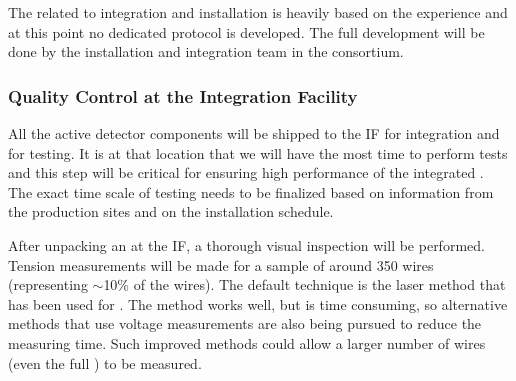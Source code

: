 The  related to integration and installation is heavily based on the  experience and at this point no dedicated  protocol is developed. The full development will be done by the installation and integration team in the  consortium. 

\subsubsection{Quality Control at the Integration Facility}
\label{sec:fdsp-apa-install-qc_if}

All the active detector components will be shipped to the IF for integration and for testing. It is at that location that we will have the most time to perform tests and this step will be critical for ensuring high performance of the integrated . The exact time scale of  testing needs to be finalized based on information from the production sites and on the installation schedule. 



\begin{comment}
\begin{dunetable}[QC List]{l|c|c}{tab:qclist}{List of tests performed for Quality Control upon reception at the integration facility}   
Test to perform   &  Number of wires/channels & Acceptable values, action\\ 
Visual inspection & All & > 99\% intact \\
Wire tension      & 10$\%$ sample & 5 $\pm$ \SI{1}{N}\\
Wire continuity   & All & $-$\\
Current leakage   & All & < X $\mu$A \\
Electronics connections & All & Perfect (> 99$\%$)\\
Cold test         & All & All intact (> 99$\%$)\\
\textbf{Overall}  & \textbf{All} & \textbf{At least 99$\%$ fully operational}\\
\end{dunetable}
\end{comment}

After unpacking an  at the IF, a thorough visual inspection will be performed. Tension measurements will be made for a sample of around \num{350} wires (representing $\sim$10\% of the wires). The default technique is the laser method that has been used for .  The method works well, but is time consuming, so alternative methods that use voltage measurements are also being pursued to reduce the measuring time. Such improved methods could allow a larger number of wires (even the full ) to be measured. 

